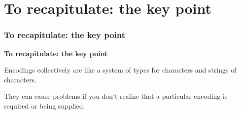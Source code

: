 \documentclass{beamer}
\begin{document}
\section{To recapitulate: the key point}
\frame
{
  \frametitle{To recapitulate: the key point}
  \textbf{To recapitulate: the key point}
  
\vskip12pt Encodings collectively are like a system of types for characters and strings of characters.
  
\vskip12pt They can cause problems if you don't realize that a particular encoding is required or being supplied.
}




\end{document}
